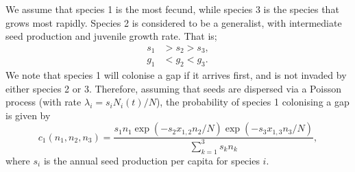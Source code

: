 We assume that species 1 is the most fecund, while species 3 is the species that grows most rapidly. Species 2 is considered to be a generalist, with intermediate seed production and juvenile growth rate. That is;
\begin{align}
s_1&>s_2>s_3,\\
g_1&<g_2<g_3.
\end{align}
We note that species 1 will colonise a gap if it arrives first, and is not invaded by either species 2 or 3. Therefore, assuming that seeds are dispersed via a Poisson process (with rate $\lambda_i=s_iN_i(t)/N$), the probability of species 1 colonising a gap is given by
\begin{equation}
\label{c1}
c_1(n_1,n_2,n_3)=\frac{s_1 n_1 \exp(-s_2x_{1,2}n_2/N)\exp(-s_3x_{1,3}n_3/N)}{\sum_{k=1}^3 s_k n_k},\end{equation}
where $s_i$ is the annual seed production per capita for species $i$.

